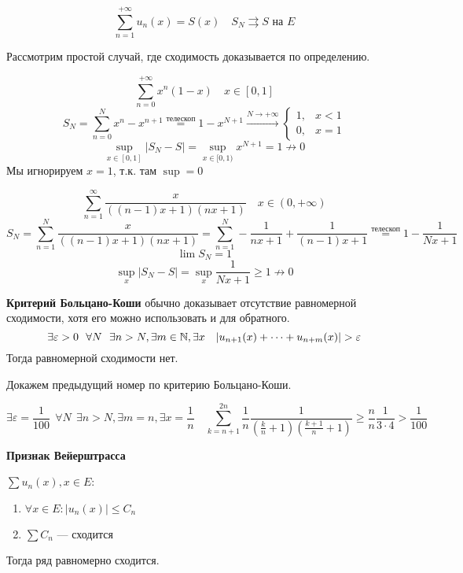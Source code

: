 \[\sum_{n = 1}^{ +\infty} u_n(x) = S(x) \quad S_N \rightrightarrows S \text{ на } E\]

Рассмотрим простой случай, где сходимость доказывается по определению.

\begin{exercise}[2769]
    \[\sum_{n = 0}^{ +\infty} x^n(1 - x) \quad x\in[0, 1]\]
    \[S_N = \sum_{n = 0}^N x^n - x^{n + 1} \stackrel{\text{телескоп}}{=} 1-x^{N + 1} \xrightarrow{N\to +\infty} \begin{cases}
            1, & x < 1 \\
            0, & x = 1
        \end{cases}\]
    \[\sup_{x\in[0, 1]} |S_N - S| = \sup_{x\in[0, 1)} x^{N + 1} = 1 \not\to 0 \]
    Мы игнорируем \(x = 1\), т.к. там \(\sup = 0\)
\end{exercise}

\begin{exercise}[2771]
    \[\sum_{n = 1}^{\infty} \frac{x}{((n - 1)x + 1)(nx + 1)} \quad x\in (0, +\infty)\]
    \[S_N = \sum_{n = 1}^{N} \frac{x}{((n - 1)x + 1)(nx + 1)} = \sum_{n = 1}^N - \frac{1}{nx + 1} + \frac{1}{(n - 1)x + 1} \stackrel{\text{телескоп}}{ =} 1 - \frac{1}{Nx + 1} \]
    \[\lim S_N = 1\]
    \[\sup_x|S_N - S| = \sup_x \frac{1}{Nx + 1} \geq 1 \not\to 0\]
\end{exercise}

\textbf{Критерий Больцано-Коши} обычно доказывает отсутствие равномерной сходимости, хотя его можно использовать и для обратного.
\[\exists \varepsilon > 0 \ \ \forall N \ \ \exists n > N, \exists m\in \N, \exists x \quad  |u_{n + 1}(x) + \dots + u_{n + m}(x)| > \varepsilon\]
Тогда равномерной сходимости нет.

Докажем предыдущий номер по критерию Больцано-Коши.

\[\exists \varepsilon = \frac{1}{100}  \ \ \forall N \ \ \exists n > N, \exists m = n, \exists x = \frac{1}{n} \quad \sum_{k = n + 1}^{2n} \frac{1}{n} \frac{1}{(\frac{k}{n} + 1)(\frac{k + 1}{n} + 1)} \geq \frac{n}{n} \frac{1}{3\cdot 4} > \frac{1}{100}\]

\textbf{Признак Вейерштрасса}

\(\sum u_n(x), x\in E\):
\begin{enumerate}
    \item \(\forall x\in E : |u_n(x)| \leq C_n\)
    \item \(\sum C_n\) --- сходится
\end{enumerate}
Тогда ряд равномерно сходится.

